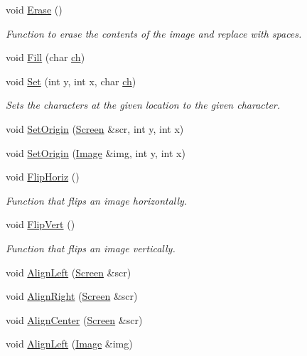 \begin{DoxyCompactItemize}
void \hyperlink{classImage_a118986dafc30b76c4aa5e7453236a8b2}{Erase} ()
\begin{DoxyCompactList}\small\item\em Function to erase the contents of the image and replace with spaces. \end{DoxyCompactList}\item 
void \hyperlink{classImage_a39486b75d05a1d3c0206a9ce909f3571}{Fill} (char \hyperlink{classImage_a2d2bff881014df332b1086483d0eb0e9}{ch})
\item 
void \hyperlink{classImage_a4fbbffe74cd76d884f1e2a96d0bb6c09}{Set} (int y, int x, char \hyperlink{classImage_a2d2bff881014df332b1086483d0eb0e9}{ch})
\begin{DoxyCompactList}\small\item\em Sets the characters at the given location to the given character. \end{DoxyCompactList}\item 
void \hyperlink{classImage_ab68774143becf8906bf8b1931511cb66}{Set\-Origin} (\hyperlink{classScreen}{Screen} \&scr, int y, int x)
\item 
void \hyperlink{classImage_adfe7a1b2cf0bd7893cdd55a646da8d77}{Set\-Origin} (\hyperlink{classImage}{Image} \&img, int y, int x)
\item 
void \hyperlink{classImage_a1c7560c1e8f95eb0a879fb4fac72fa28}{Flip\-Horiz} ()
\begin{DoxyCompactList}\small\item\em Function that flips an image horizontally. \end{DoxyCompactList}\item 
void \hyperlink{classImage_a94fe8fd85b9ef3461c2576d29ebd3a86}{Flip\-Vert} ()
\begin{DoxyCompactList}\small\item\em Function that flips an image vertically. \end{DoxyCompactList}\item 
void \hyperlink{classImage_a605b3921fed112ffb8a371341c68eb4c}{Align\-Left} (\hyperlink{classScreen}{Screen} \&scr)
\item 
void \hyperlink{classImage_abbb7cdfe276a373ad9b50d5be641eeef}{Align\-Right} (\hyperlink{classScreen}{Screen} \&scr)
\item 
void \hyperlink{classImage_a691da8aebb2d92b7471da96a19e0fc22}{Align\-Center} (\hyperlink{classScreen}{Screen} \&scr)
\item 
void \hyperlink{classImage_a863eee8dfbe927d73fba705844eb3117}{Align\-Left} (\hyperlink{classImage}{Image} \&img)

\end{DoxyCompactItemize}
